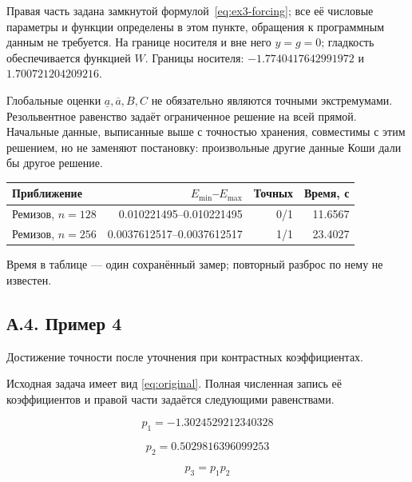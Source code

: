 Правая часть задана замкнутой формулой~\eqref{eq:ex3-forcing}; все её числовые параметры и функции определены в этом пункте, обращения к программным данным не требуется. На границе носителя и вне него $y=g=0$; гладкость обеспечивается функцией $W$. Границы носителя: $-1.7740417642991972$ и $1.700721204209216$.

Глобальные оценки $\underline a,\overline a,B,C$ не обязательно являются точными экстремумами. Резольвентное равенство задаёт ограниченное решение на всей прямой. Начальные данные, выписанные выше с точностью хранения, совместимы с этим решением, но не заменяют постановку: произвольные другие данные Коши дали бы другое решение.

\begin{center}\label{tab:ex3}\begin{tabular}{lrrr}\toprule Приближение&$E_{\min}$--$E_{\max}$&Точных&Время, с\\\midrule

Ремизов, $n=128$&0.010221495--0.010221495&0/1&11.6567\\

Ремизов, $n=256$&0.0037612517--0.0037612517&1/1&23.4027\\

\bottomrule\end{tabular}\end{center}

Время в таблице --- один сохранённый замер; повторный разброс по нему не известен.

\clearpage

\subsection*{А.4. Пример 4}\label{app:ex4}

Достижение точности после уточнения при контрастных коэффициентах.

Исходная задача имеет вид \eqref{eq:original}. Полная численная запись её коэффициентов и правой части задаётся следующими равенствами.

\begin{equation}
p_{1}=-1.3024529212340328
\end{equation}


\begin{equation}
p_{2}=0.5029816396099253
\end{equation}


\begin{equation}
p_{3}=p_{1} p_{2}
\end{equation}


